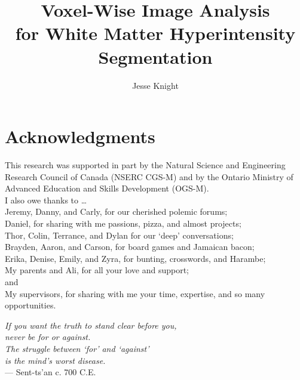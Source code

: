 \title{Voxel-Wise Image Analysis\\for White Matter Hyperintensity Segmentation}
\author{Jesse Knight}



\maketitle
\clearpage{}
\begin{abstractpage}
  
\end{abstractpage}
\clearpage{}
\setcounter{page}{3}
\section*{Acknowledgments}
This research was supported in part by
the Natural Science and Engineering Research Council of Canada (NSERC CGS-M)
and by
the Ontario Ministry of Advanced Education and Skills Development (OGS-M).\\[2em]
I also owe thanks to \dots
\\Jeremy, Danny, and Carly, for our cherished polemic forums;
\\Daniel, for sharing with me passions, pizza, and almost projects;
\\Thor, Colin, Terrance, and Dylan for our `deep' conversations;
\\Brayden, Aaron, and Carson, for board games and Jamaican bacon;
\\Erika, Denise, Emily, and Zyra, for bunting, crosswords, and Harambe;
\\My parents and Ali, for all your love and support;
\\and
\\My supervisors, for sharing with me your time, expertise, and so many opportunities.
\vfill
\begin{singlespace}
  \hspace*{4.0cm}\textit{If you want the truth to stand clear before you,}\\
  \hspace*{4.5cm}\textit{never be for or against.}                        \\
  \hspace*{4.0cm}\textit{The struggle between `for' and `against'}        \\
  \hspace*{4.5cm}\textit{is the mind's worst disease.}                    \\[0.5em]
  \hspace*{9.0cm}\normalfont{} --- Sent-ts'an c. 700 C.E.
\end{singlespace}
